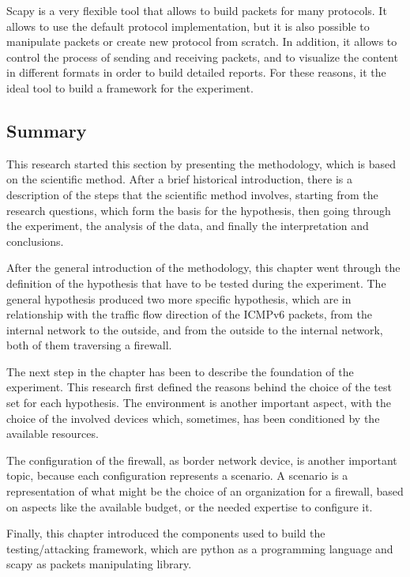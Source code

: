 \documentclass[12pt]{article}
\begin{document}
Scapy is a very flexible tool that allows to build packets for many protocols. It allows to use the default protocol implementation, but it is also possible to manipulate packets or create new protocol from scratch. In addition, it allows to control the process of sending and receiving packets, and to visualize the content in different formats in order to build detailed reports. For these reasons, it the ideal tool to build a framework for the experiment.

\subsection{Summary}
\label{sub:methConclusions}

This research started this section by presenting the methodology, which is based on the scientific method. After a brief historical introduction, there is a description of the steps that the scientific method involves, starting from the research questions, which form the basis for the hypothesis, then going through the experiment, the analysis of the data, and finally the interpretation and conclusions.

After the general introduction of the methodology, this chapter went through the definition of the hypothesis that have to be tested during the experiment. The general hypothesis produced two more specific hypothesis, which are in relationship with the traffic flow direction of the ICMPv6 packets, from the internal network to the outside, and from the outside to the internal network, both of them traversing a firewall.

The next step in the chapter has been to describe the foundation of the experiment. This research first defined the reasons behind the choice of the test set for each hypothesis. The environment is another important aspect, with the choice of the involved devices which, sometimes, has been conditioned by the available resources.

The configuration of the firewall, as border network device, is another important topic, because each configuration represents a scenario. A scenario is a representation of what might be the choice of an organization for a firewall, based on aspects like the available budget, or the needed expertise to configure it.

Finally, this chapter introduced the components used to build the testing/attacking framework, which are python as a programming language and scapy as packets manipulating library.
\end{document}
